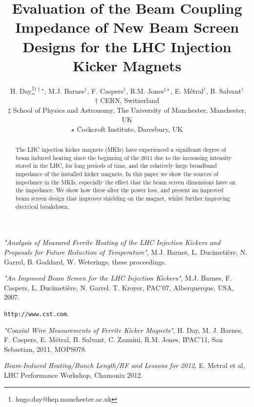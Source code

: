 \documentclass{JAC2003}
\begin{document}
\title{	Evaluation of the Beam Coupling Impedance of New Beam Screen Designs for the LHC Injection Kicker Magnets}
\author{H. Day\thanks{hugo.day@hep.manchester.ac.uk}$^{\dagger\ddagger\star}$, M.J. Barnes$^{\dagger}$, F. Caspers$^{\dagger}$, R.M. Jones$^{\ddagger \star}$, E. Métral$^{\dagger}$, B. Salvant$^{\dagger}$ \\
$\dagger$ CERN, Switzerland \\
$\ddagger$ School of Physics and Astronomy, The University of Manchester, Manchester, UK \\
$\star$ Cockcroft Institute, Daresbury, UK \\}

\maketitle

\begin{abstract}
The LHC injection kicker magnets (MKIs) have experienced a significant degree of beam induced heating since the beginning of the 2011 due to the increasing intensity stored in the LHC, for long periods of time, and the relatively large broadband impedance of the installed kicker magnets. In this paper we show the sources of impedance in the MKIs, especially the effect that the beam screen dimensions have on the impedance. We show how these alter the power loss, and present an improved beam screen design that improves shielding on the magnet, whilst further improving electrical breakdown.
\end{abstract}



\begin{thebibliography}{9}

\emph{"Analysis of Measured Ferrite Heating of the LHC Injection Kickers and Proposals for Future Reduction of Temperature"}, M.J. Barnes, L. Ducimetière, N. Garrel, B. Goddard, W. Weterings, these proceedings.

\emph{"An Improved Beam Screen for the LHC Injection Kickers"}, M.J. Barnes, F. Caspers, L. Ducimetière, N. Garrel. T. Kroyer, PAC'07, Alberquerque, USA, 2007.

\texttt{http://www.cst.com}.

\emph{"Coaxial Wire Measurements of Ferrite Kicker Magnets"}, H. Day, M. J. Barnes, F. Caspers, E. Métral, B. Salvant, C. Zannini, R.M. Jones, IPAC'11, San Sebastian, 2011, MOPS078.

\emph{Beam-Induced Heating/Bunch Length/RF and Lessons for 2012}, E. Metral et al, LHC Performance Workshop, Chamonix 2012. 


\end{thebibliography}
\end{document}
